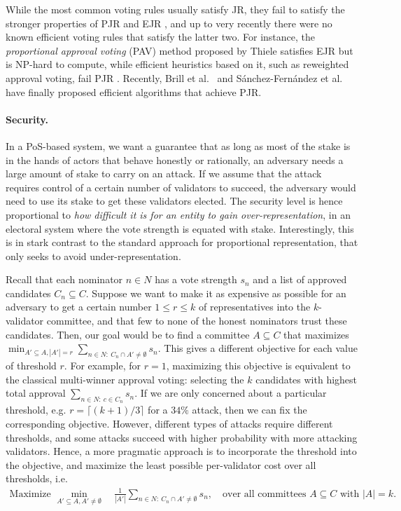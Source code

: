 While the most common voting rules usually satisfy JR, they fail to satisfy the stronger properties of PJR and EJR \cite{aziz2017justified, sanchez2017proportional}, 
and up to very recently there were no known efficient voting rules that satisfy the latter two. 
For instance, the \emph{proportional approval voting} (PAV) method \cite{thiele1895om, janson2016phragmen} proposed by Thiele satisfies EJR but is NP-hard to compute, while efficient heuristics based on it, such as reweighted approval voting, fail PJR \cite{aziz2014computational, skowron2016finding, aziz2017justified}. 
Recently, Brill et al.~\cite{brill2017phragmen} and S{\'a}nchez-Fern{\'a}ndez et al.~\cite{sanchez2016maximin} have finally proposed efficient algorithms that achieve PJR. 

\paragraph{Security.}
In a PoS-based system, we want a guarantee that as long as most of the stake is in the hands of actors that behave honestly or rationally, an adversary needs a large amount of stake to carry on an attack. 
If we assume that the attack requires control of a certain number of validators to succeed, the adversary would need to use its stake to get these validators elected. The security level is hence proportional to \emph{how difficult it is for an entity to gain over-representation}, in an electoral system where the vote strength is equated with stake. 
Interestingly, this is in stark contrast to the standard approach for proportional representation, that only seeks to avoid under-representation. 

Recall that each nominator $n\in N$ has a vote strength $s_n$ and a list of approved candidates $C_n\subseteq C$. 
Suppose we want to make it as expensive as possible for an adversary to get a certain number $1\leq r\leq k$ of representatives into the $k$-validator committee, and that few to none of the honest nominators trust these candidates. Then, our goal would be to find a committee $A\subseteq C$ that maximizes $\min_{A'\subseteq A, |A'|=r} \sum_{n\in N: \ C_n\cap A'\neq \emptyset} s_n$.
This gives a different objective for each value of threshold $r$. 
For example, for $r=1$, maximizing this objective is equivalent to the classical multi-winner approval voting: selecting the $k$ candidates with highest total approval $\sum_{n\in N: \ c\in C_n} s_n$. 
If we are only concerned about a particular threshold, e.g. $r=\lceil(k+1)/3\rceil$ for a $34\%$ attack, then we can fix the corresponding objective. However, different types of attacks require different thresholds, and some attacks succeed with higher probability with more attacking validators. Hence, a more pragmatic approach is to incorporate the threshold into the objective, and maximize the least possible per-validator cost over all thresholds, i.e.  
\begin{align}\label{eq:security}
    \text{Maximize } \min_{A'\subseteq A, A'\neq \emptyset} \quad \frac{1}{|A'|} \sum_{n\in N: \ C_n\cap A' \neq \emptyset} s_n, \quad \text{over all committees $A\subseteq C$ with $|A|=k$}.
\end{align}

